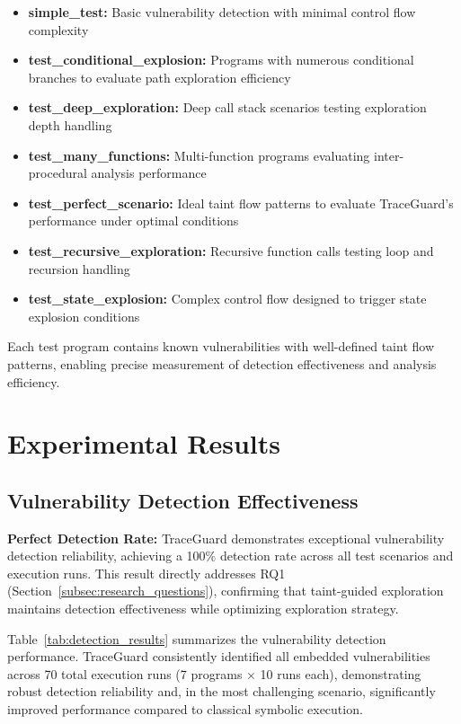 \begin{itemize}
    \item \textbf{simple\_test:} Basic vulnerability detection with minimal control flow complexity
    \item \textbf{test\_conditional\_explosion:} Programs with numerous conditional branches to evaluate path exploration efficiency
    \item \textbf{test\_deep\_exploration:} Deep call stack scenarios testing exploration depth handling
    \item \textbf{test\_many\_functions:} Multi-function programs evaluating inter-procedural analysis performance
    \item \textbf{test\_perfect\_scenario:} Ideal taint flow patterns to evaluate TraceGuard's performance under optimal conditions
    \item \textbf{test\_recursive\_exploration:} Recursive function calls testing loop and recursion handling
    \item \textbf{test\_state\_explosion:} Complex control flow designed to trigger state explosion conditions
\end{itemize}

Each test program contains known vulnerabilities with well-defined taint flow patterns, enabling precise measurement of detection effectiveness and analysis efficiency.

\section{Experimental Results}

\subsection{Vulnerability Detection Effectiveness}

\textbf{Perfect Detection Rate:} TraceGuard demonstrates exceptional vulnerability detection reliability, achieving a 100\% detection rate across all test scenarios and execution runs. This result directly addresses RQ1 (Section~\ref{subsec:research_questions}), confirming that taint-guided exploration maintains detection effectiveness while optimizing exploration strategy.

Table~\ref{tab:detection_results} summarizes the vulnerability detection performance. TraceGuard consistently identified all embedded vulnerabilities across 70 total execution runs (7 programs × 10 runs each), demonstrating robust detection reliability and, in the most challenging scenario, significantly improved performance compared to classical symbolic execution.

